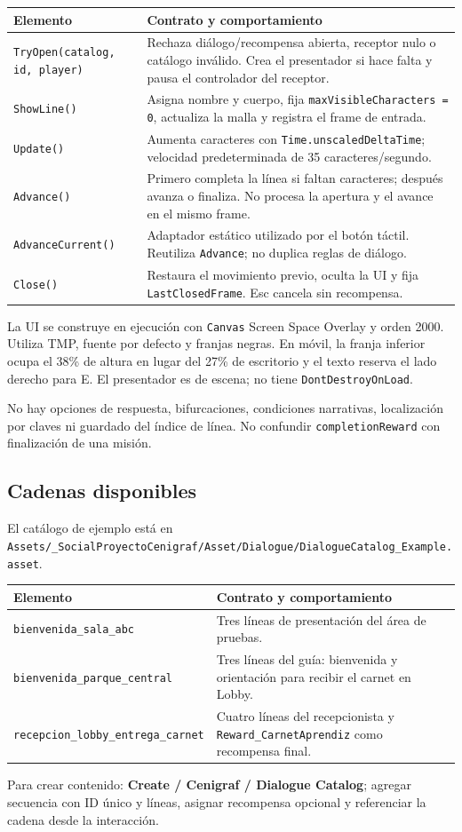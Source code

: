 \documentclass[11pt,letterpaper,oneside]{article}
\makeatletter
\newcommand{\code}[1]{\nolinkurl{#1}}
\newenvironment{spec}{\begingroup\small\begin{longtable}{@{}>{\raggedright\arraybackslash}p{0.32\textwidth}>{\raggedright\arraybackslash}p{0.64\textwidth}@{}}\toprule\textbf{Elemento} & \textbf{Contrato y comportamiento} \\ \midrule\endhead}{\bottomrule\end{longtable}\endgroup}
\makeatother
\begin{document}
\begin{spec}
\code{TryOpen(catalog, id, player)} & Rechaza diálogo/recompensa abierta, receptor nulo o catálogo inválido. Crea el presentador si hace falta y pausa el controlador del receptor. \\
\code{ShowLine()} & Asigna nombre y cuerpo, fija \code{maxVisibleCharacters = 0}, actualiza la malla y registra el frame de entrada. \\
\code{Update()} & Aumenta caracteres con \code{Time.unscaledDeltaTime}; velocidad predeterminada de 35 caracteres/segundo. \\
\code{Advance()} & Primero completa la línea si faltan caracteres; después avanza o finaliza. No procesa la apertura y el avance en el mismo frame. \\
\code{AdvanceCurrent()} & Adaptador estático utilizado por el botón táctil. Reutiliza \code{Advance}; no duplica reglas de diálogo. \\
\code{Close()} & Restaura el movimiento previo, oculta la UI y fija \code{LastClosedFrame}. Esc cancela sin recompensa. \\
\end{spec}
La UI se construye en ejecución con \code{Canvas} Screen Space Overlay y orden 2000. Utiliza TMP, fuente por defecto y franjas negras. En móvil, la franja inferior ocupa el 38\% de altura en lugar del 27\% de escritorio y el texto reserva el lado derecho para E. El presentador es de escena; no tiene \code{DontDestroyOnLoad}.

No hay opciones de respuesta, bifurcaciones, condiciones narrativas, localización por claves ni guardado del índice de línea. No confundir \code{completionReward} con finalización de una misión.

\subsection{Cadenas disponibles}
El catálogo de ejemplo está en \code{Assets/_SocialProyectoCenigraf/Asset/Dialogue/DialogueCatalog_Example.asset}.
\begin{spec}
\code{bienvenida_sala_abc} & Tres líneas de presentación del área de pruebas. \\
\code{bienvenida_parque_central} & Tres líneas del guía: bienvenida y orientación para recibir el carnet en Lobby. \\
\code{recepcion_lobby_entrega_carnet} & Cuatro líneas del recepcionista y \code{Reward_CarnetAprendiz} como recompensa final. \\
\end{spec}
Para crear contenido: \textbf{Create / Cenigraf / Dialogue Catalog}; agregar secuencia con ID único y líneas, asignar recompensa opcional y referenciar la cadena desde la interacción.
\end{document}
